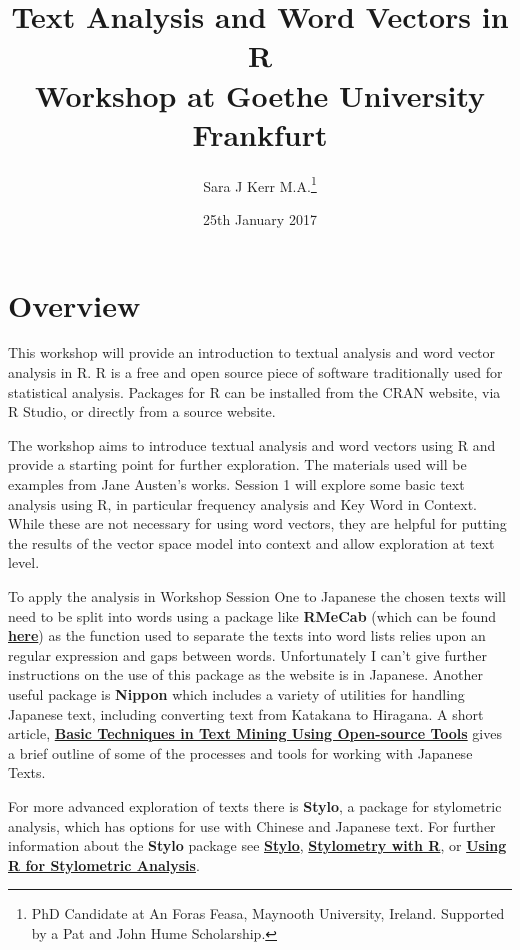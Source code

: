 \documentclass[12pt]{article}
\title{{Text Analysis and Word Vectors in R} \\ {Workshop at Goethe University Frankfurt}  \newline }
\author{Sara J Kerr M.A.\thanks{PhD Candidate at An Foras Feasa, Maynooth University, Ireland. \newline Supported by a Pat and John Hume Scholarship.}}
\date{25th January 2017}
\begin{document}
\setlength{\parindent}{0pt}
\setlength{\parskip}{1em}

\begin{titlepage}
\maketitle
\end{titlepage}

\tableofcontents

\section*{Overview}
This workshop will provide an introduction to textual analysis and word vector analysis in R.  R is a free and open source piece of software traditionally used for statistical analysis. Packages for R can be installed from the CRAN website, via R Studio, or directly from a source website.

The workshop aims to introduce textual analysis and word vectors using R and provide a starting point for further exploration. The materials used will be examples from Jane Austen's works. Session 1 will explore some basic text analysis using R, in particular frequency analysis and Key Word in Context. While these are not necessary for using word vectors, they are helpful for putting the results of the vector space model into context and allow exploration at text level.

To apply the analysis in Workshop Session One to Japanese the chosen texts will need to be split into words using a package like \textbf{RMeCab} (which can be found \href{http://rmecab.jp/wiki/index.php?RMeCab}{\textbf{here}}) as the function used to separate the texts into word lists relies upon an regular expression and gaps between words. Unfortunately I can't give further instructions on the use of this package as the website is in Japanese. Another useful package is \textbf{Nippon} which includes a variety of utilities for handling Japanese text, including converting text from Katakana to Hiragana. A short article, \href{http://opensym.org/wsos2013/proceedings/p1001-iio.pdf}{\textbf{Basic Techniques in Text Mining Using Open-source Tools}} gives a brief outline of some of the processes and tools for working with Japanese Texts.

For more advanced exploration of texts there is \textbf{Stylo}, a package for stylometric analysis, which has options for use with Chinese and Japanese text. For further information about the \textbf{Stylo} package see \href{https://cran.r-project.org/web/packages/stylo/stylo.pdf}{\textbf{Stylo}}, \href{https://journal.r-project.org/archive/accepted/eder-rybicki-kestemont.pdf}{\textbf{Stylometry with R}}, or \href{https://my.vanderbilt.edu/digitalhumanities/using-r-for-stylometric-analysis-with-the-stylo-package/}{\textbf{Using R for Stylometric Analysis}}.
\end{document}
